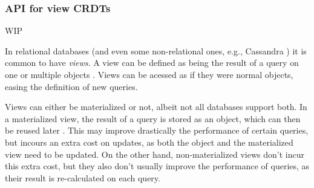\documentclass{vldb}
\newcommand{\grumbler}[2]{{\color{red}{\bf #1:} #2}}
\newcommand{\andre}[1]{\grumbler{andre}{#1}}
\newcommand{\emphvspace}{0.5\baselineskip}
\newcommand{\lineemph}[1]{\vspace{\emphvspace}\hspace{2em}\emph{#1}\vspace{\emphvspace}}
\begin{document}







\subsubsection{API for view CRDTs}
\label{subsubsec:APIVew}
\andre{WIP}

In relational databases (and even some non-relational ones, e.g., Cassandra \cite{???}) it is common to have \emph{views}. 
A view can be defined as being the result of a query on one or multiple objects \cite{???}.
Views can be acessed as if they were normal objects, easing the definition of new queries.

Views can either be materialized or not, albeit not all databases support both. %
In a materialized view, the result of a query is stored as an object, which can then be reused later \cite{???}.
This may improve drastically the performance of certain queries, but incours an extra cost on updates, as both the object and the materialized view need to be updated.
On the other hand, non-materialized views don't incur this extra cost, but they also don't usually improve the performance of queries, as their result is re-calculated on each query.
\end{document}

